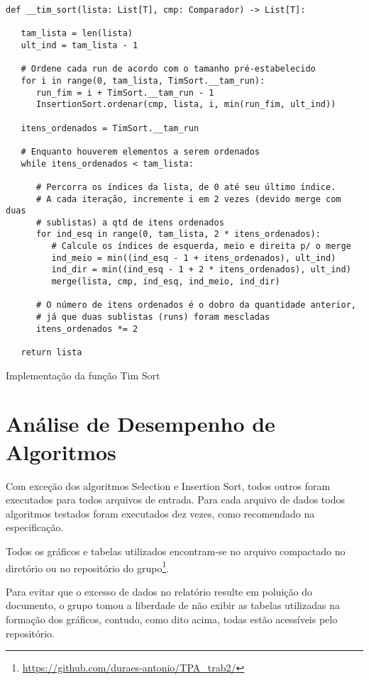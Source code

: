 \documentclass[a4paper,12pt]{scrartcl}
\begin{document}
\begin{listing}[H]
\begin{verbatim}
def __tim_sort(lista: List[T], cmp: Comparador) -> List[T]:

   tam_lista = len(lista)
   ult_ind = tam_lista - 1

   # Ordene cada run de acordo com o tamanho pré-estabelecido
   for i in range(0, tam_lista, TimSort.__tam_run):
      run_fim = i + TimSort.__tam_run - 1
      InsertionSort.ordenar(cmp, lista, i, min(run_fim, ult_ind))

   itens_ordenados = TimSort.__tam_run

   # Enquanto houverem elementos a serem ordenados
   while itens_ordenados < tam_lista:

      # Percorra os índices da lista, de 0 até seu último índice.
      # A cada iteração, incremente i em 2 vezes (devido merge com duas
      # sublistas) a qtd de itens ordenados
      for ind_esq in range(0, tam_lista, 2 * itens_ordenados):
         # Calcule os índices de esquerda, meio e direita p/ o merge
         ind_meio = min((ind_esq - 1 + itens_ordenados), ult_ind)
         ind_dir = min((ind_esq - 1 + 2 * itens_ordenados), ult_ind)
         merge(lista, cmp, ind_esq, ind_meio, ind_dir)

      # O número de itens ordenados é o dobro da quantidade anterior,
      # já que duas sublistas (runs) foram mescladas
      itens_ordenados *= 2

   return lista
\end{verbatim}
\caption{\footnotesize{Implementação da função Tim Sort}}
\end{listing}

\section{Análise de Desempenho de Algoritmos}
Com exceção dos algoritmos Selection e Insertion Sort, todos outros foram executados para todos arquivos de entrada. Para cada arquivo de dados todos algoritmos testados foram executados dez vezes, como recomendado na especificação.

Todos os gráficos e tabelas utilizados encontram-se no arquivo compactado no diretório  ou no repositório do grupo\footnote{\url{https://github.com/duraes-antonio/TPA_trab2/}}.

Para evitar que o excesso de dados no relatório resulte em poluição do documento, o grupo tomou a liberdade de não exibir as tabelas utilizadas na formação dos gráficos, contudo, como dito acima, todas estão acessíveis pelo repositório.
\end{document}
